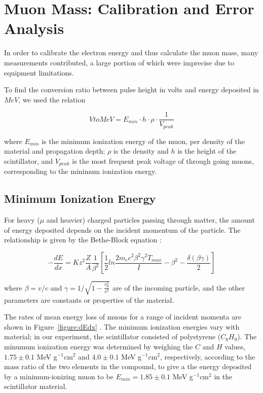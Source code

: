 
\section{Muon Mass: Calibration and Error Analysis}\label{masscalibration}

In order to calibrate the electron energy and thus calculate the muon
mass, many measurements contributed, a large portion of which were
imprecise due to equipment limitations.

To find the conversion ratio between pulse height in volts and energy
deposited in $MeV$, we used the relation

\begin{equation} VtoMeV = E_{min}\cdot h\cdot\rho\cdot\frac{1}{V_{peak}}\end{equation}   

where $E_{min}$ is the minimum ionization energy of the muon, per
density of the material and propagation depth; $\rho$ is the density
and $h$ is the height of the scintillator, and $V_{peak}$ is the most
frequent peak voltage of through going muons, corresponding to the
minimum ionization energy.

\subsection{Minimum Ionization Energy}\label{minionizationenergy}

For heavy ($\mu$ and heavier) charged particles passing through
matter, the amount of energy deposited depends on the incident
momentum of the particle. The relationship is given by the Bethe-Block
equation \cite{yao}:

\begin{equation}
-\frac{dE}{dx} = Kz^2\frac{Z}{A}\frac{1}{\beta^2}\left[\frac{1}{2}ln\frac{2m_ec^2\beta^2\gamma^2T_{max}}{I} - \beta^2 - \frac{\delta(\beta\gamma)}{2}\right]
\end{equation}

where $\beta = v/c$ and $\gamma = 1/\sqrt{1 - \frac{v_{\mu}^2}{c^2}}$
are of the incoming particle, and the other parameters are constants
or properties of the material.

The rates of mean energy loss of muons for a range of incident momenta
are shown in Figure~\ref{figure:dEdx} \cite{yao}. The minimum
ionization energies vary with material; in our experiment, the
scintillator consisted of polystyrene ($C_8H_9$). The minumum
ionization energy was determined by weighing the $C$ and $H$ values,
$1.75\pm 0.1$ MeV g$^{-1}$cm$^{2}$ and $4.0\pm 0.1$
MeV g$^{-1}$cm$^{2}$, respectively, according to the mass ratio of the
two elements in the compound, to give a the energy deposited by a
minimum-ionizing muon to be $E_{min} = 1.85 \pm 0.1$ MeV g$^{-1}$cm$^{2}$ in the
scintillator material.

